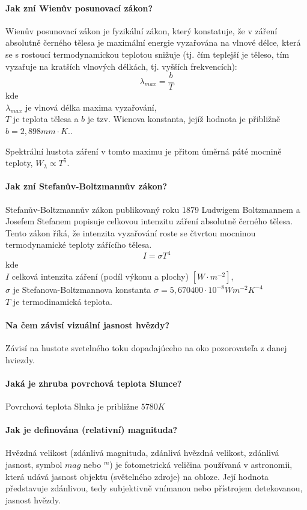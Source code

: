 \documentclass[11pt,a4paper,notitlepage,twocolumn]{article}
\begin{document}
\paragraph{Jak zní Wienův posunovací zákon?}
Wienův posunovací zákon je fyzikální zákon, který konstatuje, že v záření absolutně černého tělesa je maximální energie vyzařována na vlnové délce, která se s rostoucí termodynamickou teplotou snižuje (tj. čím teplejší je těleso, tím vyzařuje na kratších vlnových délkách, tj. vyšších frekvencích):
\[ \lambda_{max} = \frac{b}{T} \]
kde\\
$ \lambda_{max}  $ je vlnová délka maxima vyzařování,\\
$ T $ je teplota tělesa a 
$ b $ je tzv. Wienova konstanta, jejíž hodnota je přibližně $ b = 2,898 mm\cdot K. $.

Spektrální hustota záření v tomto maximu je přitom úměrná páté mocnině teploty, 
$ W_\lambda \propto T^5 $.
\paragraph{Jak zní Stefanův-Boltzmannův zákon?}
Stefanův-Boltzmannův zákon publikovaný roku 1879 Ludwigem Boltzmannem a Josefem Stefanem popisuje celkovou intenzitu záření absolutně černého tělesa. Tento zákon říká, že intenzita vyzařování roste se čtvrtou mocninou termodynamické teploty zářícího tělesa.
\[ I = \sigma T^4 \]
kde\\
$ I $ celková intenzita zá\v{r}ení (podíl výkonu a plochy) $ [W\cdot m^{-2}] $,\\
$ \sigma $ je Stefanova-Boltzmannova konstanta 
$ \sigma = 5,670400 \cdot 10^{-8} W m^{-2} K^{-4}  $\\
$ T $ je termodinamická teplota.
\paragraph{Na čem závisí vizuální jasnost hvězdy?}
Závisí na hustote svetelného toku dopadajúceho na oko pozorovateľa z danej hviezdy.
\paragraph{Jaká je zhruba povrchová teplota Slunce?}
Povrchová teplota Slnka je približne $ 5780K $
\paragraph{Jak je definována (relativní) magnituda?}
Hvězdná velikost (zdánlivá magnituda, zdánlivá hvězdná velikost, zdánlivá jasnost, symbol
$ mag $ nebo $ ^m $) je fotometrická veličina používaná v astronomii, 
která udává jasnost objektu (světelného zdroje) na obloze.
Její hodnota představuje zdánlivou, tedy subjektivně vnímanou nebo přístrojem detekovanou,
jasnost hvězdy.
\end{document}
